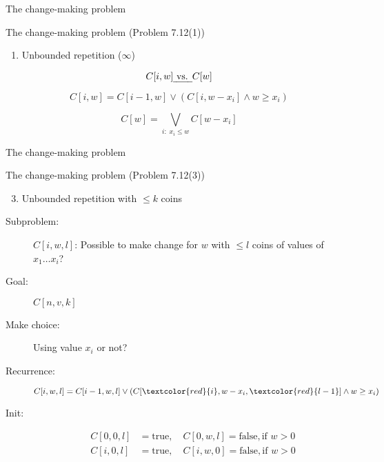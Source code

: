 \begin{frame}{The change-making problem}
  \begin{exampleblock}{The change-making problem (Problem 7.12(1))}
	\begin{enumerate}[(1)]
	  \item Unbounded repetition ($\infty$)
	\end{enumerate}
  \end{exampleblock}

  \[
	C[i,w] \text{\emph{ vs. }} C[w]
  \]

  \[
	C[i,w] = C[i-1, w] \lor (C[i, w-x_{i}] \land w \ge x_{i})
  \]

  \[
	C[w] = \bigvee_{i: \; x_i \le w} C[w-x_i]
  \]
\end{frame}
\begin{frame}{The change-making problem}
  \begin{exampleblock}{The change-making problem (Problem 7.12(3))}
	\begin{enumerate}[(1)]
	  \setcounter{enumi}{2}
	  \item Unbounded repetition with $\le k$ coins
	\end{enumerate}
  \end{exampleblock}

  \pause
  \begin{description}
	\item[Subproblem:] $C[i,w,l]$: Possible to make change for $w$ with $\le l$ coins of values of $x_{1} \dots x_{i}$?
	\item[Goal:] $C[n,v,k]$
	  \pause
	\item[Make choice:] Using value $x_{i}$ or not? 
	\item[Recurrence:] 
	  \[
		C[i,w,l] = C[i-1,w,l] \lor \left( C[\textcolor{red}{i}, w-x_{i}, \textcolor{red}{l-1}] \land w \ge x_{i} \right)
	  \]
	  \pause
	\item[Init:]
	  \begin{align*}
		C[0,0,l] &= \text{true}, \quad C[0,w,l] = \text{false}, \text{if } w > 0 \\
		C[i,0,l] &= \text{true}, \quad C[i,w,0] = \text{false}, \text{if } w > 0
	  \end{align*}
  \end{description}
\end{frame}
